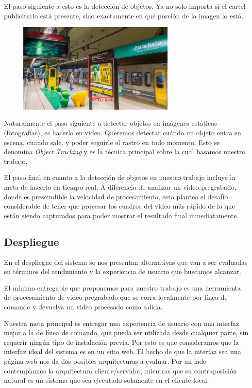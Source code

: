\documentclass[a4paper]{article}
\begin{document}
El paso siguiente a esto es la detección de objetos. Ya no solo importa si el cartel publicitario está presente, sino exactamente en qué porción de la imagen lo está.

\begin{figure}[H]
    \includegraphics[width=0.7\textwidth]{./img/detection.jpg}
    \centering
\end{figure}

Naturalmente el paso siguiente a detectar objetos en imágenes estáticas (fotografías), es hacerlo en video. Queremos detectar cuándo un objeto entra en escena, cuando sale, y poder seguirle el rastro en todo momento. Esto se denomina \emph{Object Tracking} y es la técnica principal sobre la cual basamos nuestro trabajo.

El paso final en cuanto a la detección de objetos en nuestro trabajo incluye la meta de hacerlo en tiempo real. A diferencia de analizar un video pregrabado, donde es prescindible la velocidad de procesamiento, esto plantea el desafío considerable de tener que procesar los cuadros del video más rápido de lo que están siendo capturados para poder mostrar el resultado final inmediatamente.

\subsection{Despliegue}
En el despliegue del sistema se nos presentan alternativas que van a ser evaluadas en términos del rendimiento y la experiencia de usuario que buscamos alcanzar.

El mínimo entregable que proponemos para nuestro trabajo es una herramienta de procesamiento de video pregrabado que se corra localmente por línea de comando y devuelva un video procesado como salida.

Nuestra meta principal es entregar una experiencia de usuario con una interfaz mejor a la de línea de comando, que pueda ser utilizada desde cualquier parte, sin requerir ningún tipo de instalación previa. Por esto es que consideramos que la interfaz ideal del sistema es en un sitio web.
El hecho de que la interfaz sea una página web nos da dos posibles arquitecturas a evaluar. Por un lado contemplamos la arquitectura cliente/servidor, mientras que su contraposición natural es un sistema que sea ejecutado solamente en el cliente local.
\end{document}
